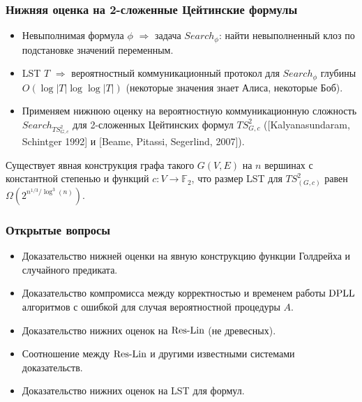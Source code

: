 \begin{frame}
    \frametitle{Нижняя оценка на 2-сложенные Цейтинские формулы}

    \begin{itemize}
		\item Невыполнимая формула $\phi$ $\Rightarrow$ задача $Search_\phi$: найти невыполненный клоз по подстановке
		    значений переменным.
        \pause 
		\item LST $T$ $\Rightarrow$ вероятностный коммуникационный протокол для $Search_\phi$ глубины $O(\log |T|
		    \log\log |T|)$ (некоторые значения знает Алиса, некоторые Боб).
        \pause
		\item Применяем нижнюю оценку на вероятностную коммуникационную сложность $Search_{TS^2_{G,c}}$ для 2-сложенных
		    Цейтинских формул $TS^2_{G,c}$ ([Kalyanasundaram, Schintger 1992] и [Beame, Pitassi, Segerlind, 2007]).
	\end{itemize}
	\pause
    \begin{theorem}
        Существует явная конструкция графа такого $G(V, E)$ на $n$ вершинах с константной степенью и функций $c: V \to
        \mathbb{F}_2$, что размер LST для $TS^2_{(G,c)}$ равен $\Omega\left(2^{n^{1 / 3} / \log^3(n)} \right)$.
    \end{theorem}
\end{frame}


\begin{frame}
    \frametitle{Открытые вопросы}

    \begin{itemize}
        \item Доказательство нижней оценки на явную конструкцию функции Голдрейха и случайного предиката.
        \item Доказательство компромисса между корректностью и временем работы $\mathrm{DPLL}$ алгоритмов с ошибкой для случая
    		вероятностной процедуры $A$.
		\item Доказательство нижних оценок на $\mathrm{Res\mbox{-}Lin}$ (не древесных).
		\item Соотношение между $\mathrm{Res\mbox{-}Lin}$ и другими известными системами доказательств.
		\item Доказательство нижних оценок на LST для  формул.
	\end{itemize}
\end{frame}


